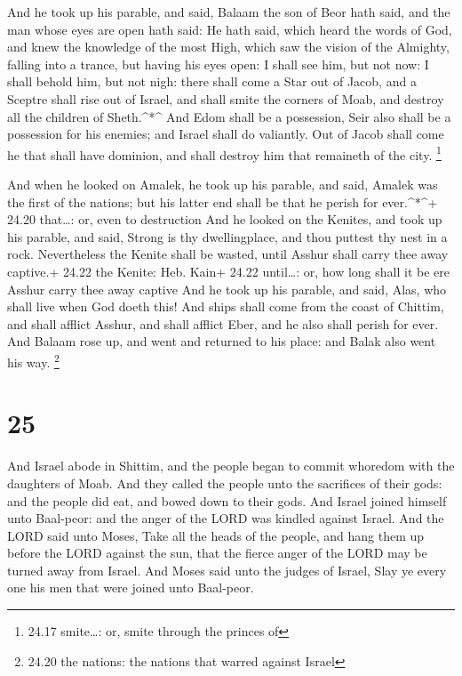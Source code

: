  And he took up his parable, and said, Balaam the son of
Beor hath said, and the man whose eyes are open hath said: 
He hath said, which heard the words of God, and knew the knowledge of
the most High, which saw the vision of the Almighty, falling into a
trance, but having his eyes open:  I shall see him, but not
now: I shall behold him, but not nigh: there shall come a Star out of
Jacob, and a Sceptre shall rise out of Israel, and shall smite the
corners of Moab, and destroy all the children of Sheth.\^{}*\^{}
 And Edom shall be a possession, Seir also shall be a
possession for his enemies; and Israel shall do valiantly. 
Out of Jacob shall come he that shall have dominion, and shall destroy
him that remaineth of the city. \footnote{24.17 smite\ldots: or, smite
  through the princes of}

 And when he looked on Amalek, he took up his parable, and
said, Amalek was the first of the nations; but his latter end shall be
that he perish for ever.\^{}*\^{}+ 24.20 that\ldots: or, even to
destruction  And he looked on the Kenites, and took up his
parable, and said, Strong is thy dwellingplace, and thou puttest thy
nest in a rock.  Nevertheless the Kenite shall be wasted,
until Asshur shall carry thee away captive.+ 24.22 the Kenite: Heb.
Kain+ 24.22 until\ldots: or, how long shall it be ere Asshur carry thee
away captive  And he took up his parable, and said, Alas,
who shall live when God doeth this!  And ships shall come
from the coast of Chittim, and shall afflict Asshur, and shall afflict
Eber, and he also shall perish for ever.  And Balaam rose
up, and went and returned to his place: and Balak also went his way.
\footnote{24.20 the nations: the nations that warred against Israel}

\hypertarget{section-24}{%
\section{25}\label{section-24}}

 And Israel abode in Shittim, and the people began to commit
whoredom with the daughters of Moab.  And they called the
people unto the sacrifices of their gods: and the people did eat, and
bowed down to their gods.  And Israel joined himself unto
Baal-peor: and the anger of the LORD was kindled against Israel.
 And the LORD said unto Moses, Take all the heads of the
people, and hang them up before the LORD against the sun, that the
fierce anger of the LORD may be turned away from Israel. 
And Moses said unto the judges of Israel, Slay ye every one his men that
were joined unto Baal-peor.

